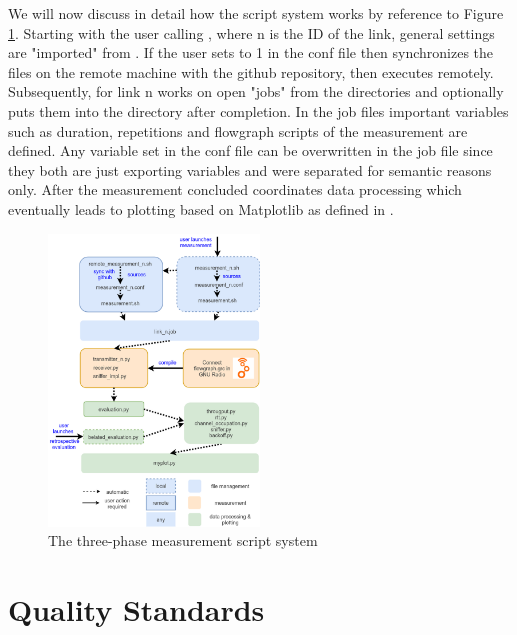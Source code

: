 We will now discuss in detail how the script system works by reference to Figure \ref{fig:script-system}.
Starting with the user calling , where n is the ID of the link, general settings are "imported" from . If the user sets  to 1 in the conf file then  synchronizes the files on the remote machine with the github repository, then executes  remotely. Subsequently,  for link n works on open "jobs" from the  directories and optionally puts them into the  directory after completion. In the job files important variables such as duration, repetitions and flowgraph scripts of the measurement are defined. Any variable set in the conf file can be overwritten in the job file since they both are just exporting variables and were separated for semantic reasons only. After the measurement concluded  coordinates data processing which eventually leads to plotting based on Matplotlib as defined in .

\begin{figure}[bt]
	\label{fig:script-system}
	\begin{center}
		\includegraphics[width=0.5\textwidth]{pictures/script_system}
	\end{center}
	\caption{The three-phase measurement script system}
\end{figure}

\clearpage

\section{Quality Standards}
\label{sec:quality-standards}

